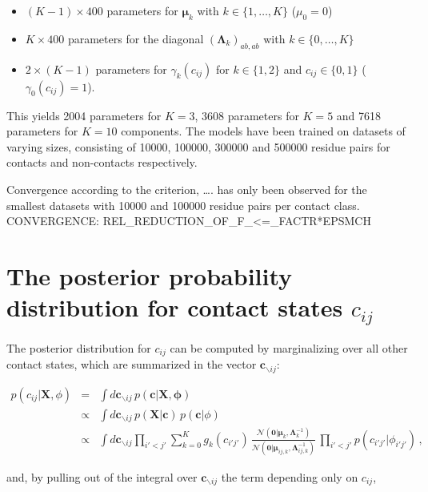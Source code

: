 \documentclass[11pt,a4paper,twoside]{book}
\providecommand{\tightlist}{%
  \setlength{\itemsep}{0pt}\setlength{\parskip}{0pt}}
\newcommand{\eq}{\!=\!}
\newcommand{\Gauss}{\mathcal{N}}
\newcommand{\Lijk}{\mathbf{\Lambda}_{ij,k}}
\newcommand{\Lk}{\mathbf{\Lambda}_k}
\newcommand{\muijk}{\mathbf{\mu}_{ij,k}}
\newcommand{\muk}{\mathbf{\mu}_k}
\renewcommand{\c}{\mathbf{c}}
\newcommand{\cij}{c_{ij}}
\newcommand{\X}{\mathbf{X}}
\theoremstyle{definition}
\theoremstyle{definition}
\theoremstyle{remark}
\begin{document}
\begin{itemize}
\tightlist
\item
  \((K-1) \times 400\) parameters for \(\muk\) with
  \(k \in \{1, \ldots, K \}\) (\(\mu_0 = 0\))
\item
  \(K \times 400\) parameters for the diagonal \((\Lk)_{ab, ab}\) with
  \(k \in \{0, \ldots, K\}\)
\item
  \(2 \times (K\!-\!1)\) parameters for \(\gamma_k(\cij)\) for
  \(k \in \{1,2\}\) and \(\cij \in \{0,1\}\) (\(\gamma_0(\cij)\eq1\)).
\end{itemize}

This yields 2004 parameters for \(K\eq3\), 3608 parameters for \(K\eq5\)
and 7618 parameters for \(K\eq10\) components. The models have been
trained on datasets of varying sizes, consisting of 10000, 100000,
300000 and 500000 residue pairs for contacts and non-contacts
respectively.

Convergence according to the criterion, \ldots{}. has only been observed
for the smallest datasets with 10000 and 100000 residue pairs per
contact class. CONVERGENCE:
REL\_REDUCTION\_OF\_F\_\textless{}=\_FACTR*EPSMCH

\section{\texorpdfstring{The posterior probability distribution for
contact states
\(\cij\)}{The posterior probability distribution for contact states \textbackslash{}cij}}\label{posterior-of-rij}

The posterior distribution for \(c_{ij}\) can be computed by
marginalizing over all other contact states, which are summarized in the
vector \(\c_{\backslash ij}\):

\begin{eqnarray}
    p(\cij | \X, \phi) &=& \int d \c_{\backslash ij} \, p(\c |\X, \mathbf{\phi}) \nonumber\\
                &\propto & \int d \c_{\backslash ij} \, p(\X|\c) \, p(\c | \phi) \nonumber\\
                &\propto & \int d \c_{\backslash ij} \prod_{i'<j'} \sum_{k=0}^K g_{k}(c_{i'j'}) \, \frac{\Gauss( \mathbf{0} | \muk, \Lk^{-1})}{\Gauss(\mathbf{0} | \muijk, \Lijk^{-1})}
 \, \prod_{i'<j'} p(c_{i'j'} |\phi_{i'j'})  \,,
 \end{eqnarray}

and, by pulling out of the integral over \(\c_{\backslash ij}\) the term
depending only on \(\cij\),
\end{document}
